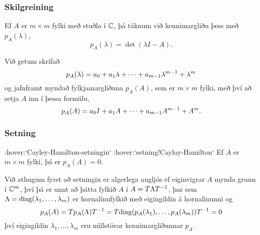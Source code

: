 \subsubsection{Skilgreining} Ef $A$ er $m\times m$ fylki með stuðla í ${\mathbb C}$, þá táknum við
kennimargliðu þess með $p_A(\lambda)$, 
 $$p_A(\lambda)=\det(\lambda I-A).
 $$


 
Við getum skrifað
 $$
p_A(\lambda)=a_0+a_1\lambda+\cdots+a_{m-1}\lambda\sp{m-1}+\lambda\sp m
 $$
og jafnframt myndað fylkjamargliðuna $p_A(A)$, sem er $m\times m$ fylki,
með
því að setja $A$ inn í þessa formúlu,
 $$
p_A(A)=a_0I+a_1A+\cdots+a_{m-1}A\sp{m-1}+A\sp m.
 $$

\subsubsection{Setning} :hover:`Cayley-Hamilton-setningin`
 :hover:`setning!Caylay-Hamilton`
Ef $A$ er $m\times m$ fylki, þá er $p_A(A)=0$.

{}


  Við athugum fyrst að setningin er algerlega augljós ef eiginvigrar
$A$ mynda grunn í ${\mathbb C}\sp m$, því þá er unnt að þátta fylkið $A$ í
$A=T\Lambda T\sp{-1}$, þar sem
$\Lambda={\operatorname{diag}}(\lambda_1,\dots,\lambda_m)$ er hornalínufylkið með
eigingildin á hornalínunni og 
 $$p_A(A)=Tp_A(\Lambda)T\sp{-1}=
T{\operatorname{diag}}(p_A(\lambda_1),\dots,p_A(\lambda_m))T\sp{-1}=0
 $$
því eigingildin $\lambda_1,\dots,\lambda_m$ eru núllstövar
kennimargliðunnar $p_A$.

